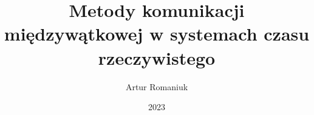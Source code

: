 \documentclass[thesis=inz,faculty=ee]{EE-dyplom}
\title{Metody komunikacji międzywątkowej w systemach czasu rzeczywistego}
\author{Artur Romaniuk}
\date{2023}
\begin{document}
\frontpages



\bibliografia


\acronymslist
\end{document}

